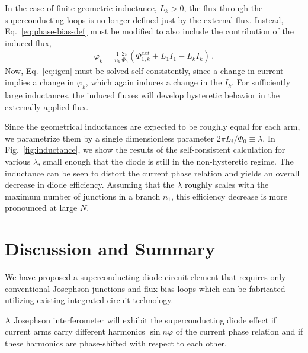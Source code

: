 \documentclass[aps,rsi,reprint,amsmath,amssymb,floatfix,longbibliography,superscriptaddress]{revtex4-1}
\begin{document}
In the case of finite geometric inductance, $L_k>0$, the flux through the superconducting loops is no longer defined just by the external flux. Instead, Eq.~\eqref{eq:phase-bias-def} must be modified to also include the contribution of the induced flux,
\begin{align}
\varphi_k =
\frac{1}{n_k}\frac{2\pi}{\Phi_0} \left( 
\Phi_{1,k}^{ext} + L_1 I_1 - L_k I_k
\right) \,.
\end{align}
Now, Eq.~\eqref{eq:igen} must be solved self-consistently, since a change in current implies a change in $\varphi_k$, which again induces a change in the $I_k$. For sufficiently large inductances, the induced fluxes will develop hysteretic behavior in the externally applied flux. 

Since the geometrical inductances are expected to be roughly equal for each arm, we parametrize them by a single dimensionless parameter $2\pi L_i/\Phi_0 \equiv \lambda$.
In Fig.~\ref{fig:inductance}, we show the results of the self-consistent calculation for various $\lambda$, small enough that the diode is still in the non-hysteretic regime. The inductance can be seen to distort the current phase relation and yields an overall decrease in diode efficiency. Assuming that the $\lambda$ roughly scales with the maximum number of junctions in a branch $n_1$, this efficiency decrease is more pronounced at large $N$.






\section{Discussion and Summary}
\label{sec:conclusion}

We have proposed a superconducting diode circuit element that requires only conventional Josephson junctions and flux bias loops which can be fabricated utilizing existing integrated circuit technology.

A Josephson interferometer will exhibit the superconducting diode effect if current arms carry different harmonics $\sin n \varphi$ of the current phase relation and if these harmonics are phase-shifted with respect to each other.
\end{document}
